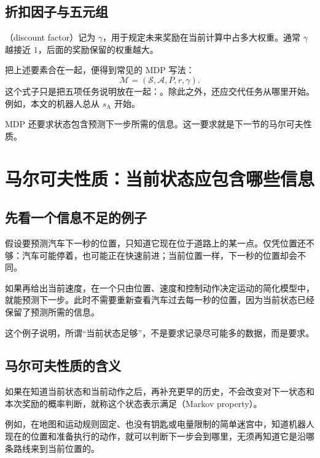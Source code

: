 \documentclass[UTF8]{ctexart}
\begin{document}
\subsection{折扣因子与五元组}

（discount factor）记为 $\gamma$，用于规定未来奖励在当前计算中占多大权重。通常 $\gamma$ 越接近 $1$，后面的奖励保留的权重越大。

把上述要素合在一起，便得到常见的 MDP 写法：
\begin{equation}
  \mathcal M=(\mathcal S,\mathcal A,P,r,\gamma).
  \label{eq:mdp-tuple}
\end{equation}
这个式子只是把五项任务说明放在一起：。除此之外，还应交代任务从哪里开始。例如，本文的机器人总从 $s_{\mathrm A}$ 开始。

MDP 还要求状态包含预测下一步所需的信息。这一要求就是下一节的马尔可夫性质。

\section{马尔可夫性质：当前状态应包含哪些信息}
\label{sec:mdp-markov}

\subsection{先看一个信息不足的例子}

假设要预测汽车下一秒的位置，只知道它现在位于道路上的某一点。仅凭位置还不够：汽车可能停着，也可能正在快速前进；当前位置一样，下一秒的位置却会不同。

如果再给出当前速度，在一个只由位置、速度和控制动作决定运动的简化模型中，就能预测下一步。此时不需要重新查看汽车过去每一秒的位置，因为当前状态已经保留了预测所需的信息。

这个例子说明，所谓“当前状态足够”，不是要求记录尽可能多的数据，而是要求。

\subsection{马尔可夫性质的含义}

\begin{definition}[马尔可夫性质]
如果在知道当前状态和当前动作之后，再补充更早的历史，不会改变对下一状态和本次奖励的概率判断，就称这个状态表示满足（Markov property）。
\end{definition}

例如，在地图和运动规则固定、也没有钥匙或电量限制的简单迷宫中，知道机器人现在的位置和准备执行的动作，就可以判断下一步会到哪里，无须再知道它是沿哪条路线来到当前位置的。
\end{document}
